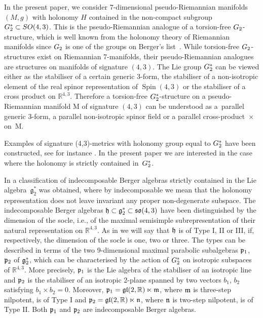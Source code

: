 \documentclass[11pt]{article}
\numberwithin{equation}{section}
\newcommand\fh{{\frak h}}
\newcommand{\SO}{\mathop{{\rm SO}}}
\newcommand{\Spin}{\operatorname{Spin}}
\newcommand{\G}{\mathop{{{\rm G}_{2}^*}}}
\begin{document}
 In the present paper, we consider $7$-dimensional pseudo-Riemannian manifolds $(M, g)$ with holonomy $H$ contained in the non-compact subgroup $\G \subset \SO(4, 3)$. This is the pseudo-Riemannian analogue of a torsion-free ${\rm G}_2$-structure, which is well known from the holonomy theory of Riemannian manifolds since ${\rm G}_2$ is one of the groups on Berger's list~\cite{Berger}. While torsion-free ${\rm G}_2$-structures exist on Riemannian 7-manifolds, their pseudo-Riemannian analogues are structures on manifolds of signature $(4,3)$. The Lie group $\G$ can be viewed either as the stabiliser of a certain generic 3-form, the stabiliser of a non-isotropic element of the real spinor representation of $\Spin(4, 3)$ or the stabiliser of a cross product on ${\mathbb R}^{4,3}$. Therefore a torsion-free $\G$-structure on a pseudo-Riemannian manifold M of signature $(4, 3)$ can be understood as a~parallel generic $3$-form, a parallel non-isotropic spinor field or a parallel cross-product~$\times$ on~M.

Examples of signature (4,3)-metrics with holonomy group equal to $\G$ have been constructed, see for instance \cite{ALN, CLSS, FL, GW, LP, W2}. In the present paper we are interested in the case where the holonomy is strictly contained in~$\G$.

In \cite{FK} a classification of indecomposable Berger algebras strictly contained in the Lie algebra~$\mathfrak g_2^*$ was obtained, where by indecomposable we mean that the holonomy representation does not leave invariant any proper non-degenerate subspace. The indecomposable Berger algebras $\fh \subset \mathfrak g_2^* \subset \mathfrak{so}(4, 3)$ have been distinguished by the dimension of the socle, i.e., of the maximal semisimple subrepresentation of their natural representation on ${\mathbb R}^{4,3}$. As in \cite{FK} we will say that $\fh$ is of Type I, II or III, if, respectively, the dimension of the socle is one, two or three. The types can be described in terms of the two 9-dimensional maximal parabolic subalgebras $\frak p_1$, $\frak p_2 $ of $\frak g_2^*$, which can be characterised by the action of $\G$ on isotropic subspaces of $\mathbb R^{4,3}$. More precisely, $\frak p_1$ is the Lie algebra of the stabiliser of an isotropic line and $\frak p_2$ is the stabiliser of an isotropic 2-plane spanned by two vectors $b_1$, $b_2$ satisfying $b_1 \times b_2 = 0$. Moreover, $\frak p_1 = {\frak {gl}} (2,\mathbb R) \ltimes \frak m$, where $\frak m$ is three-step nilpotent, is of Type I and $\frak p_2 = {\frak {gl}} (2,\mathbb R) \ltimes \frak n$, where $\frak n$ is two-step nilpotent, is of Type II.
Both $\frak p_1$ and $\frak p_2$ are indecomposable Berger algebras.
\end{document}
